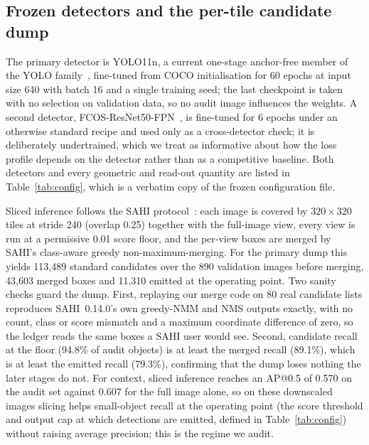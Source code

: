 \subsection{Frozen detectors and the per-tile candidate dump}\label{sec:detectors}

The primary detector is YOLO11n, a current one-stage anchor-free member of the YOLO family~\citep{redmon2016yolo}, fine-tuned from COCO initialisation for 60 epochs at input size 640 with batch 16 and a single training seed; the last checkpoint is taken with no selection on validation data, so no audit image influences the weights. A second detector, FCOS-ResNet50-FPN~\citep{tian2019fcos}, is fine-tuned for 6 epochs under an otherwise standard recipe and used only as a cross-detector check; it is deliberately undertrained, which we treat as informative about how the loss profile depends on the detector rather than as a competitive baseline. Both detectors and every geometric and read-out quantity are listed in Table~\ref{tab:config}, which is a verbatim copy of the frozen configuration file.



Sliced inference follows the SAHI protocol~\citep{akyon2022sahi}: each image is covered by $320\times320$ tiles at stride 240 (overlap 0.25) together with the full-image view, every view is run at a permissive 0.01 score floor, and the per-view boxes are merged by SAHI's class-aware greedy non-maximum-merging. For the primary dump this yields 113{,}489 standard candidates over the 890 validation images before merging, 43{,}603 merged boxes and 11{,}310 emitted at the operating point. Two sanity checks guard the dump. First, replaying our merge code on 80 real candidate lists reproduces SAHI~0.14.0's own greedy-NMM and NMS outputs exactly, with no count, class or score mismatch and a maximum coordinate difference of zero, so the ledger reads the same boxes a SAHI user would see. Second, candidate recall at the floor (94.8\% of audit objects) is at least the merged recall (89.1\%), which is at least the emitted recall (79.3\%), confirming that the dump loses nothing the later stages do not. For context, sliced inference reaches an AP@0.5 of 0.570 on the audit set against 0.607 for the full image alone, so on these downscaled images slicing helps small-object recall at the operating point (the score threshold and output cap at which detections are emitted, defined in Table~\ref{tab:config}) without raising average precision; this is the regime we audit.

